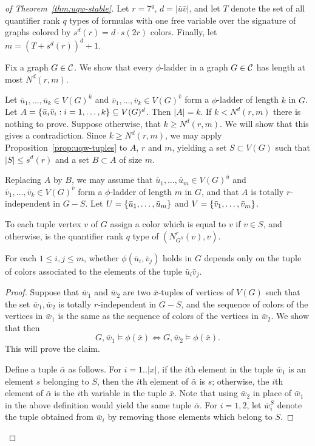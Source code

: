 \begin{proof}[ of Theorem~\ref{thm:uqw-stable}]
Let $r= 7^q$, 
$d=|\bar u\bar v|$,
and let $T$ denote the set of all quantifier rank $q$ types of 
formulas with one free variable over the signature of  graphs colored by $s^d(r)=d\cdot s(2r)$ colors.
Finally, let $m=(T+s^d(r))^d+1$. 

Fix a graph $G\in \cal C$. We show that 
every $\phi$-ladder in a graph $G\in\cal C$ has length at most $N^d(r,m)$.
		
	Let $\bar u_1,\ldots,\bar u_k\in V(G)^{\bar u}$ and $\bar v_1,\ldots,\bar v_k\in V(G)^{\bar v}$
	form a $\phi$-ladder of length $k$ in $G$. 
	Let $A=\set{\bar u_i\bar v_i: i=1,\ldots,k}\subset V(G)^d$.
	Then $|A|=k$. If $k< N^d(r,m)$ there is nothing to prove.
	Suppose otherwise, that $k\ge N^d(r,m)$. We will show that this gives a contradiction.	
	Since $k\ge N^d(r,m)$, we may
apply Proposition~\ref{prop:uqw-tuples} to $A$, $r$ and $m$,
		 yielding a set $S\subset V(G)$ such that $|S|\le s^d(r)$
	and a set $B\subset A$ of size $m$.

Replacing $A$ by $B$, we may assume that $\bar u_1,\ldots,\bar u_m\in V(G)^{\bar u}$ and $\bar v_1,\ldots,\bar v_k\in V(G)^{\bar v}$
form a $\phi$-ladder of length $m$ in $G$, and 
that $A$ is totally $r$-independent in $G-S$.
Let $U=\set{\bar u_1,\ldots,\bar u_m}$ 
and $V=\set{\bar v_1,\ldots,\bar v_m}$.

To each tuple vertex $v$ of $G$ 
assign a color which is equal to $v$ if $v\in S$,
and otherwise, is the quantifier rank $q$ type of  $(N^r_{G^S}(v),v)$.



\begin{claim}
	For each $1\le i,j\le m$, whether $\phi(\bar u_i,\bar v_j)$
	holds in $G$ depends only on the tuple of colors associated to
	the elements of the tuple $\bar u_i\bar v_j$.
\end{claim}
\begin{proof}
	Suppose that $\bar w_1$ and $\bar w_2$ are two $\bar x$-tuples of 
	vertices of $V(G)$ such that the set ${\bar w_1,\bar w_2}$ is totally $r$-independent in $G-S$, and the sequence of colors of the vertices in $\bar w_1$ is the same as the sequence of colors of the vertices in $\bar w_2$. We show that then $$G,\bar w_1\models \phi(\bar x)\iff G,\bar w_2\models \phi(\bar x).$$ This will prove the claim. 
	
	Define a tuple $\bar \alpha$ as follows. For $i=1..|x|$, if the $i$th element in the tuple $\bar w_1$ is an element $s$ belonging to $S$, then the $i$th element of $\bar \alpha$ is $s$;
	otherwise, the $i$th element of $\bar \alpha$ is the $i$th variable in the tuple $\bar x$. Note that using $\bar w_2$ in place of $\bar w_1$ in the above definition would yield the same tuple $\bar \alpha$. 	For $i=1,2$, let $\bar w_i^S$ denote the tuple obtained from $\bar w_i$ by removing those elements which belong to $S$.
	

\end{proof}
\end{proof}
